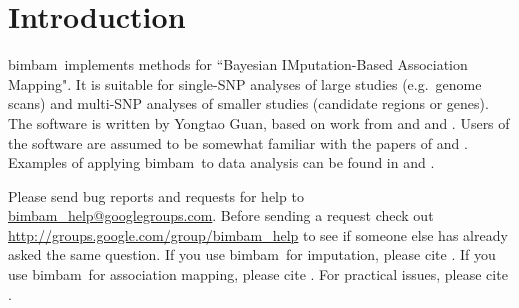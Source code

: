 \documentclass[11pt,Palatino]{article}
\def\bimbam{{\sc bimbam}~}
\begin{document}
\def\citeN{\cite}
\section{Introduction}

\bimbam implements methods for ``Bayesian IMputation-Based Association Mapping". It is suitable for single-SNP analyses of large studies (e.g.~genome scans) and multi-SNP analyses of smaller studies (candidate regions or genes). The software is written by Yongtao Guan, based on work from \cite{scheet.stephens.06} and \citeN{servin.stephens.07} and \citeN{guan.stephens.08}. Users of the software are assumed to be somewhat familiar with the papers of \cite{servin.stephens.07} and \cite{guan.stephens.08}.  Examples of applying \bimbam to data analysis can be found in \citeN{reiner.etal.08} and \citeN{barber.etal.10}. 

Please send bug reports and requests for help to \url{ bimbam_help@googlegroups.com}.
Before sending a request check out \url{http://groups.google.com/group/bimbam_help} to see if someone else has already asked the same question.
{If you use \bimbam for imputation, please cite \cite{scheet.stephens.06}. If you use \bimbam for association mapping, please cite \cite{servin.stephens.07}. For practical issues, please cite \cite{guan.stephens.08}.}  %

%
\end{document}
